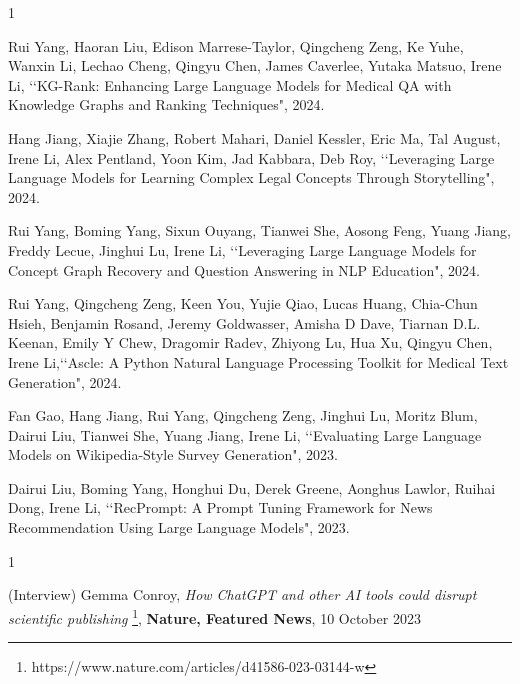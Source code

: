 






\begin{発表}{1}  %

Rui Yang, Haoran Liu, Edison Marrese-Taylor, Qingcheng Zeng, Ke Yuhe, Wanxin Li, Lechao Cheng, Qingyu Chen, James Caverlee, Yutaka Matsuo, Irene Li, \lq\lq KG-Rank: Enhancing Large Language Models for Medical QA with Knowledge Graphs and Ranking Techniques", 2024.

Hang Jiang, Xiajie Zhang, Robert Mahari, Daniel Kessler, Eric Ma, Tal August, Irene Li, Alex Pentland, Yoon Kim, Jad Kabbara, Deb Roy, \lq\lq Leveraging Large Language Models for Learning Complex Legal Concepts Through Storytelling", 2024.

Rui Yang, Boming Yang, Sixun Ouyang, Tianwei She, Aosong Feng, Yuang Jiang, Freddy Lecue, Jinghui Lu, Irene Li, \lq\lq Leveraging Large Language Models for Concept Graph Recovery and Question Answering in NLP Education", 2024.

Rui Yang, Qingcheng Zeng, Keen You, Yujie Qiao, Lucas Huang, Chia-Chun Hsieh, Benjamin Rosand, Jeremy Goldwasser, Amisha D Dave, Tiarnan D.L. Keenan, Emily Y Chew, Dragomir Radev, Zhiyong Lu, Hua Xu, Qingyu Chen, Irene Li,\lq\lq Ascle: A Python Natural Language Processing Toolkit for Medical Text Generation", 2024.

Fan Gao, Hang Jiang, Rui Yang, Qingcheng Zeng, Jinghui Lu, Moritz Blum, Dairui Liu, Tianwei She, Yuang Jiang, Irene Li, \lq\lq Evaluating Large Language Models on Wikipedia-Style Survey Generation", 2023.

Dairui Liu, Boming Yang, Honghui Du, Derek Greene, Aonghus Lawlor, Ruihai Dong, Irene Li, \lq\lq RecPrompt: A Prompt Tuning Framework for News Recommendation Using Large Language Models", 2023.




\end{発表}  %


\begin{報道}{1}  %

(Interview) Gemma Conroy, \textit{How ChatGPT and other AI tools could disrupt scientific publishing} \footnote{https://www.nature.com/articles/d41586-023-03144-w}, \textbf{Nature, Featured News}, 10 October 2023 

\end{報道}  %

